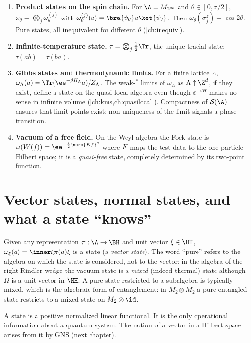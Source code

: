 \begin{enumerate}
\item \textbf{Product states on the spin chain.} For $\A=M_{2^\infty}$ and $\theta\in[0,\pi/2]$, $\omega_\theta=\bigotimes_j\omega^{(j)}_\theta$ with $\omega^{(j)}_\theta(a)=\bra{\psi_\theta}a\ket{\psi_\theta}$. Then $\omega_\theta(\sigma^z_j)=\cos2\theta$. Pure states, all inequivalent for different $\theta$ (\cref{ch:inequiv}).
\item \textbf{Infinite-temperature state.} $\tau=\bigotimes_j\tfrac12\Tr$, the unique tracial state: $\tau(ab)=\tau(ba)$.
\item \textbf{Gibbs states and thermodynamic limits.} For a finite lattice $\Lambda$, $\omega_\Lambda(a)=\Tr(\ee^{-\beta H_\Lambda}a)/Z_\Lambda$. The weak-$^*$ limits of $\omega_\Lambda$ as $\Lambda\uparrow\Z^d$, if they exist, define a state on the quasi-local algebra even though $\ee^{-\beta H}$ makes no sense in infinite volume (\cref{ch:kms,ch:quasilocal}). Compactness of $\mathcal S(\A)$ ensures that limit points exist; non-uniqueness of the limit signals a phase transition.
\item \textbf{Vacuum of a free field.} On the Weyl algebra the Fock state is $\omega(W(f))=\ee^{-\frac12\norm{Kf}^2}$ where $K$ maps the test data to the one-particle Hilbert space; it is a \emph{quasi-free} state, completely determined by its two-point function.
\end{enumerate}

\section{Vector states, normal states, and what a state ``knows''}

Given any representation $\pi:\A\to\BH$ and unit vector $\xi\in\HH$, $\omega_\xi(a)=\inner\xi{\pi(a)\xi}$ is a state (a \emph{vector state}). The word ``pure'' refers to the algebra on which the state is considered, not to the vector: in the algebra of the right Rindler wedge the vacuum state is a \emph{mixed} (indeed thermal) state although $\Omega$ is a unit vector in $\HH$. A pure state restricted to a subalgebra is typically mixed, which is the algebraic form of entanglement: in $M_2\otimes M_2$ a pure entangled state restricts to a mixed state on $M_2\otimes\id$.

\begin{keyidea}
A state is a positive normalized linear functional. It is the only operational information about a quantum system. The notion of a vector in a Hilbert space arises from it by GNS (next chapter).
\end{keyidea}

